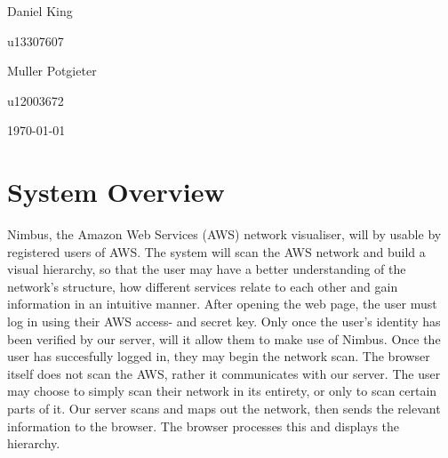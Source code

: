 \documentclass[hidelinks,a4paper,12pt]{article}
\begin{document}
\begin{titlepage}
\begin{center}
\begin{minipage}{0.4\textwidth}
\begin{flushleft} \large
Daniel {King}
\end{flushleft}
\end{minipage}
\begin{minipage}{0.4\textwidth}
\begin{flushright} \large
\emph{}
u13307607
\end{flushright}
\end{minipage}

\begin{minipage}{0.4\textwidth}
\begin{flushleft} \large
Muller {Potgieter}
\end{flushleft}
\end{minipage}
\begin{minipage}{0.4\textwidth}
\begin{flushright} \large
\emph{}
u12003672
\end{flushright}
\end{minipage}
\vfill
{\large \today}
\end{center}
\end{titlepage}
\footnotesize
%
\normalsize


\tableofcontents
\newpage
{}

\newpage
\section{System Overview} 

Nimbus, the Amazon Web Services (AWS) network visualiser, will by usable by registered users of AWS. The system will scan the AWS network and build a visual hierarchy, so that the user may have a better understanding of the network's structure, how different services relate to each other and gain information in an intuitive manner. After opening the web page, the user must log in using their AWS access- and secret key. Only once the user's identity has been verified by our server, will it allow them to make use of Nimbus. Once the user has succesfully logged in, they may begin the network scan. The browser itself does not scan the AWS, rather it communicates with our server. The user may choose to simply scan their network in its entirety, or only to scan certain parts of it. Our server scans and maps out the network, then sends the relevant information to the browser. The browser processes this and displays the hierarchy.
\end{document}
